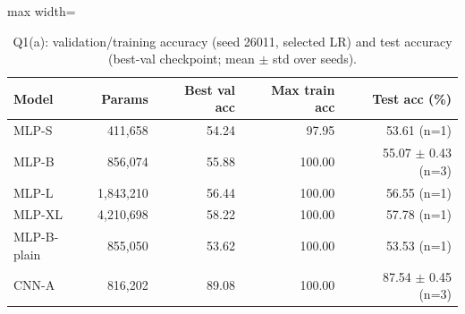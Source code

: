 \begin{table}[t]\centering\footnotesize\setlength{\tabcolsep}{3pt}
\begin{adjustbox}{max width=\columnwidth}
\begin{tabular}{lrrrr}\toprule
Model & Params & Best val acc & Max train acc & Test acc (\%) \\\midrule
MLP-S & 411,658 & 54.24 & 97.95 & 53.61 (n=1) \\
MLP-B & 856,074 & 55.88 & 100.00 & 55.07 $\pm$ 0.43 (n=3) \\
MLP-L & 1,843,210 & 56.44 & 100.00 & 56.55 (n=1) \\
MLP-XL & 4,210,698 & 58.22 & 100.00 & 57.78 (n=1) \\
MLP-B-plain & 855,050 & 53.62 & 100.00 & 53.53 (n=1) \\
CNN-A & 816,202 & 89.08 & 100.00 & 87.54 $\pm$ 0.45 (n=3) \\
\bottomrule\end{tabular}
\end{adjustbox}
\caption{Q1(a): validation/training accuracy (seed 26011, selected LR) and test accuracy (best-val checkpoint; mean $\pm$ std over seeds).}\label{tab:q1a}\end{table}
